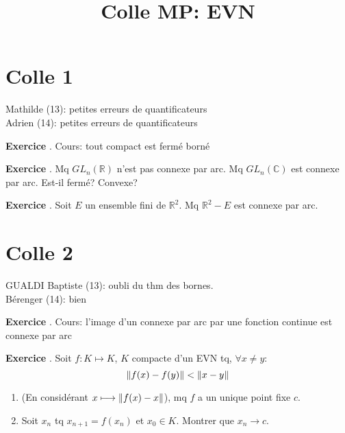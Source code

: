 \documentclass[10pt,a4paper]{article}
\title{Colle MP: EVN}
\newcounter{question}
\newcounter{exo}
\newenvironment{exo}{\vspace{0.5cm}\setcounter{question}{0}\addtocounter{exo}{1} \noindent \textbf{Exercice \theexo}. \normalsize }{\par}
\begin{document}
	\maketitle
	
	\section*{Colle 1}
	Mathilde (13): petites erreurs de quantificateurs\\
	Adrien (14): petites erreurs de quantificateurs\\
		
	\begin{exo}
	Cours: tout compact est fermé borné
	\end{exo}
	
	\begin{exo}
		Mq $GL_n(\mathbb{R})$ n'est pas connexe par arc. Mq $GL_n(\mathbb{C})$ est connexe par arc. Est-il fermé? Convexe?
	\end{exo}
		
	\begin{exo}
		Soit $E$ un ensemble fini de $\mathbb{R}^2$. Mq $\mathbb{R}^2 - E$ est connexe par arc.
	\end{exo}
	
	\section*{Colle 2}
	\setcounter{exo}{0}
	GUALDI Baptiste (13): oubli du thm des bornes.\\
	Bérenger (14): bien\\
	
	\begin{exo}
		Cours: l'image d'un connexe par arc par une fonction continue est connexe par arc
	\end{exo}

	
	\begin{exo}
		Soit $f : K \longmapsto K$, $K$ compacte d'un EVN tq, $\forall x \neq y$:
		$$\Arrowvert f(x) - f(y) \Arrowvert < \Arrowvert x - y \Arrowvert$$ 
	\begin{enumerate}
		\item (En considérant $x \longmapsto \Arrowvert f(x) - x \Arrowvert$), mq $f$ a un unique point fixe $c$.\\
		\item Soit $x_n$ tq $x_{n+1} = f(x_n)$ et $x_0 \in K$. Montrer que $x_n \longrightarrow c$.
	\end{enumerate}
	\end{exo}
\end{document}
